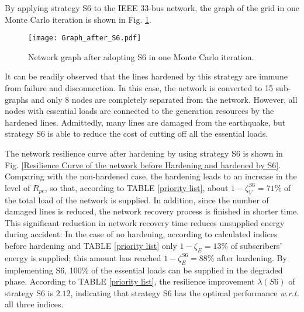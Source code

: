 \documentclass[conference]{IEEEtran}
\begin{document}
By applying strategy S6 to the IEEE 33-bus network, the graph of the grid in one Monte Carlo iteration is shown in Fig. \ref{after S6}.\begin{figure}[!htb]
    \centering
    \texttt{[image: Graph\_after\_S6.pdf]}
    \caption{Network graph after adopting S6 in one Monte Carlo iteration.}
    \label{after S6}
\end{figure}
It can be readily observed that the lines hardened by this strategy are immune from failure and disconnection. In this case, the network is converted to 15 sub-graphs and only 8 nodes are completely separated from the network. However, all nodes with essential loads are connected to the generation resources by the hardened lines. Admittedly, many lines are damaged from the earthquake, but strategy S6 is able to reduce the cost of cutting off all the essential loads.

The network resilience curve after hardening by using strategy S6 is shown in Fig. \ref{Resilience Curve of the network before Hardening and hardened by S6}. Comparing with the non-hardened case, the hardening leads to an increase in the level of $R_{pe}$, so that, according to TABLE \ref{priority list}, about $1-\zeta_V^{S6}=71\%$ of the total load of the network is supplied. In addition, since the number of damaged lines is reduced, the network recovery process is finished in shorter time. This significant reduction in network recovery time reduces unsupplied energy during accident: In the case of no hardening, according to calculated indices before hardening and TABLE \ref{priority list} only $1-\zeta_E=13\%$ of subscribers' energy is supplied; this amount has reached $1-\zeta_E^{S6}=88\%$ after hardening. By implementing S6, 100\% of the essential loads can be supplied in the degraded phase. According to TABLE \ref{priority list}, the resilience improvement $\lambda(S6)$ of strategy S6 is $2.12$, indicating that strategy S6 has the optimal performance \emph{w.r.t.} all three indices.
\end{document}
